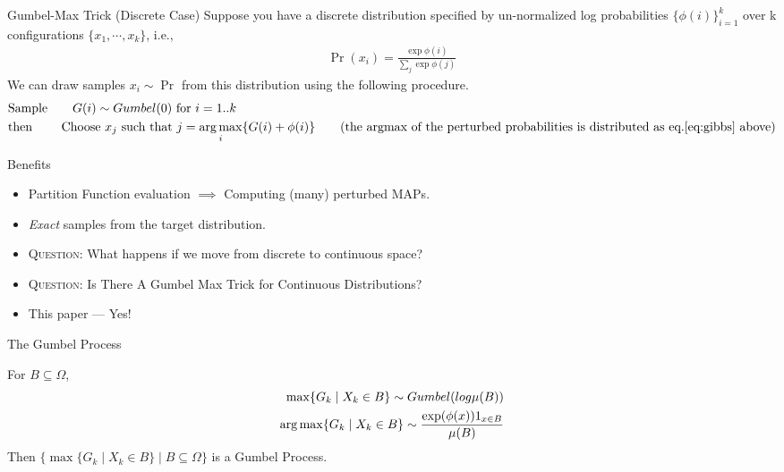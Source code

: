 \begin{frame}{Gumbel-Max Trick (Discrete Case)}
  Suppose you have a discrete distribution specified by un-normalized log probabilities $\{\phi(i)\}_{i=1}^{k}$ over k configurations $\{x_1,\cdots,x_k\}$, i.e.,
  \begin{align}
    \Pr(x_i) = \frac{\exp\phi(i)}{\sum_j\exp\phi(j)} \label{eq:gibbs}
  \end{align}
  We can draw samples $x_i \sim \Pr$ from this distribution using the following procedure.
  \begin{align*}
    & \text{Sample} \qquad G(i) \sim Gumbel(0) \text{ for } i=1..k\\
    & \text{then} \qquad \text{ Choose } x_j \text{ such that } j= \argmax_i \{G(i) +\phi(i)\} \tag{the argmax of the perturbed probabilities is distributed as eq.\ref{eq:gibbs} above}
  \end{align*}
\end{frame}

\begin{frame}{Benefits}
  \begin{itemize}[<+->]
  \item Partition Function evaluation $\implies$ Computing (many) perturbed MAPs. %
  \item \emph{Exact} samples from the target distribution. %
  \end{itemize}
  
  \begin{itemize}[<+->]
  \item \textsc{Question:} What happens if we move from discrete to continuous space?
  \item \textsc{Question:} Is There A Gumbel Max Trick for Continuous Distributions?
  \item {\color{red} This paper --- Yes!}
  \end{itemize}
\end{frame}

\begin{frame}{The Gumbel Process}
  \begin{definition}
    For $B \subseteq \Omega$,
    \begin{align*}
      \max \{G_k \mid X_k \in B\} \sim Gumbel(log \mu(B)) \\
      \operatorname*{{arg\,max}} \{G_k \mid X_k \in B\} \sim \frac{\exp(\phi(x))1_{x \in B}}{\mu(B)} \\
    \end{align*}
    Then $\{ \max \{G_k \mid X_k \in B\} \mid B \subseteq \Omega\}$ is a Gumbel Process.
\end{definition}\end{frame}

